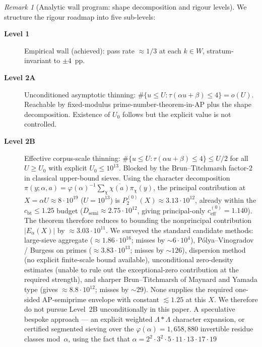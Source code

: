 \documentclass[11pt]{article}
\renewcommand{\_}{\origunderscore\allowbreak}
\theoremstyle{definition}
\theoremstyle{remark}
\newtheorem{remark}[theorem]{Remark}
\begin{document}
\begin{remark}[Analytic wall program: shape decomposition and rigour levels]
We structure the rigour roadmap into five sub-levels:
\begin{description}
  \item[\textbf{Level 1}] Empirical wall (achieved): pass rate
        $\approx 1/3$ at each $k\in W$, stratum-invariant to $\pm 4$~pp.
  \item[\textbf{Level 2A}] Unconditioned asymptotic thinning:
        $\#\{u\le U:\tau(\alpha u+\beta)\le 4\}=o(U)$.  Reachable by
        fixed-modulus prime-number-theorem-in-AP plus the shape
        decomposition.  Existence of $U_{0}$ follows but the explicit
        value is not controlled.
  \item[\textbf{Level 2B}] Effective corpus-scale thinning:
        $\#\{u\le U:\tau(\alpha u+\beta)\le 4\}\le U/2$ for all
        $U\ge U_{0}$ with explicit $U_{0}\le 10^{13}$.  Blocked by
        the Brun--Titchmarsh factor-$2$ in classical upper-bound
        sieves.  Using the character decomposition
        $\pi(y;\alpha,a)=\varphi(\alpha)^{-1}\sum_{\chi}\overline{\chi(a)}\pi_{\chi}(y)$,
        the principal contribution at $X=\alpha U\approx 8\cdot10^{19}$
        ($U=10^{13}$) is
        $P_{2}^{(0)}(X)\approx 3.13\cdot10^{12}$, already within the
        $c_{\mathrm{bt}}\le 1.25$ budget
        ($D_{\mathrm{semi}}\approx 2.75\cdot10^{12}$, giving
        principal-only $c_{\mathrm{eff}}^{(0)}=1.140$).  The theorem
        therefore reduces to bounding the nonprincipal contribution
        $|E_{\alpha}(X)|$ by $\approx 3.03\cdot10^{11}$.  We
        surveyed the standard candidate methods: large-sieve
        aggregate ($\approx 1.86\cdot10^{16}$; misses by
        $\sim\!6\cdot10^{4}$), P\'olya--Vinogradov / Burgess on
        primes ($\approx 3.83\cdot10^{13}$; misses by $\sim\!126$),
        dispersion method (no explicit finite-scale bound
        available), unconditional zero-density estimates (unable to
        rule out the exceptional-zero contribution at the required
        strength), and sharper Brun--Titchmarsh of Maynard and
        Yamada type (gives $\approx 8.8\cdot10^{12}$; misses by
        $\sim\!29$).  None supplies the required one-sided
        AP-semiprime envelope with constant $\lesssim 1.25$ at this
        $X$.  We therefore do not pursue Level~2B unconditionally
        in this paper.  A speculative bespoke approach --- an
        explicit weighted $\Lambda\!*\!\Lambda$ character expansion,
        or certified segmented sieving over the
        $\varphi(\alpha)=1{,}658{,}880$ invertible residue classes
        mod~$\alpha$, using the fact that
        $\alpha=2^{2}\cdot 3^{2}\cdot 5\cdot 11\cdot 13\cdot 17\cdot 19$

\end{description}
\end{remark}
\end{document}
